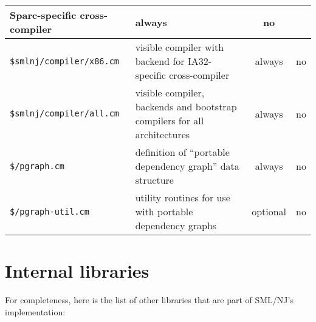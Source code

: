 \begin{small}
\begin{center}
\begin{tabular}{p{2.3in}||p{2.9in}|c|c}
Sparc-specific cross-compiler & always & no \\
\hline
{\tt \$smlnj/compiler/x86.cm} & visible compiler with backend for
IA32-specific cross-compiler & always & no \\
\hline
{\tt \$smlnj/compiler/all.cm} & visible compiler, backends and
bootstrap compilers for all architectures & always & no \\
\hline
{\tt \$/pgraph.cm} & definition of ``portable dependency graph'' data
structure & always & no \\
\hline
{\tt \$/pgraph-util.cm} & utility routines for use with portable
dependency graphs & optional & no
\end{tabular}
\end{center}
\end{small}

\section{Internal libraries}

For completeness, here is the list of other libraries that are part of
SML/NJ's implementation:

